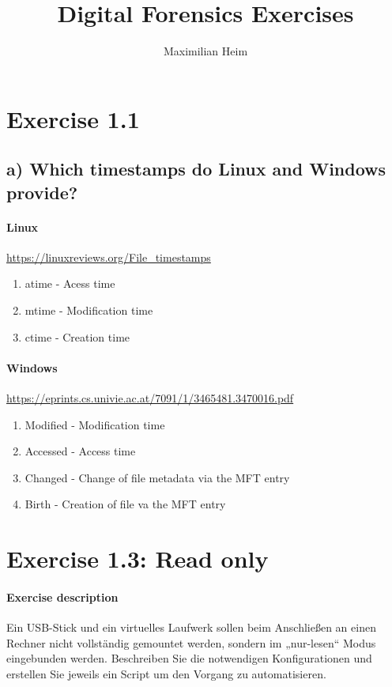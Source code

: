 \documentclass[10pt,a4paper]{article}
\author{Maximilian Heim}
\title{Digital Forensics Exercises}
\begin{document}
\maketitle
\newpage
\tableofcontents
\newpage
\section{Exercise 1.1}
\subsection{a) Which timestamps do Linux and Windows provide?}
\paragraph{Linux}
\url{https://linuxreviews.org/File_timestamps}
\begin{enumerate}
    \item atime - Acess time
    \item mtime - Modification time
    \item ctime - Creation time
\end{enumerate}

\paragraph{Windows}
\url{https://eprints.cs.univie.ac.at/7091/1/3465481.3470016.pdf}
\begin{enumerate}
    \item Modified - Modification time
    \item Accessed - Access time
    \item Changed - Change of file metadata via the MFT entry
    \item Birth - Creation of file va the MFT entry
\end{enumerate}

\section{Exercise 1.3: Read only}
\paragraph{Exercise description}
Ein USB-Stick und ein virtuelles Laufwerk sollen beim Anschließen an einen Rechner nicht vollständig gemountet werden,
sondern im „nur-lesen“ Modus eingebunden werden. Beschreiben Sie die notwendigen Konfigurationen und erstellen Sie
jeweils ein Script um den Vorgang zu automatisieren.
\end{document}
